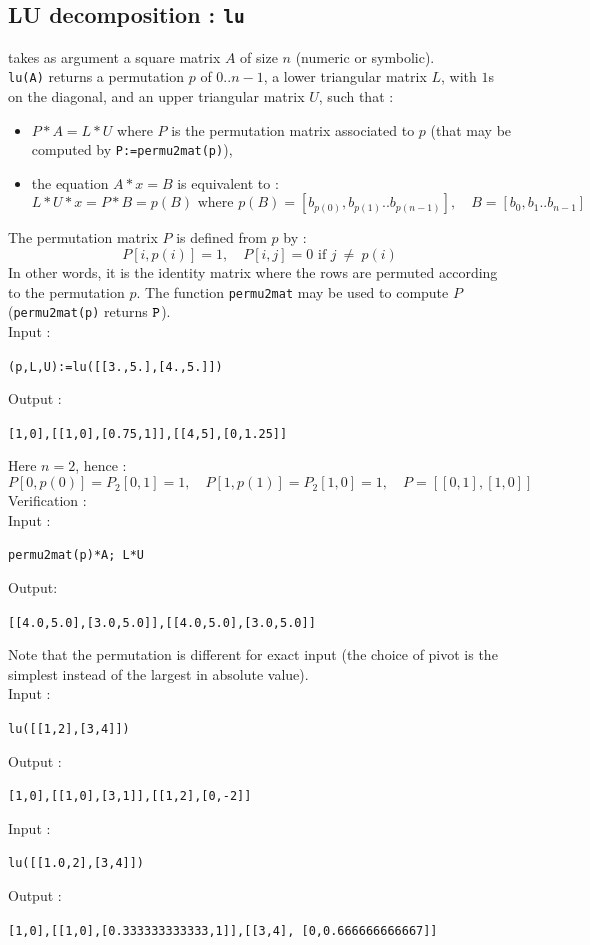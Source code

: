 \documentclass[a4paper,11pt]{book}
\begin{document}
\subsection{LU decomposition : {\tt lu}}
 takes as argument a square matrix $A$ of size $n$ (numeric or
symbolic).\\
{\tt lu(A)} returns a permutation $p$ of 0..$n-1$, 
a lower triangular matrix $L$, with $1$s on the diagonal, 
and an upper triangular matrix $U$, such that : 
\begin{itemize}
\item $P*A=L*U$ where $P$ is the permutation matrix 
associated to $p$ (that may be computed by {\tt P:=permu2mat(p)}),
\item the equation $A*x=B$ is equivalent to :
\[ L*U*x=P*B=p(B) \mbox{ where } p(B)=[b_{p(0)},b_{p(1)}..b_{p(n-1)}],
\quad  B=[b_0,b_1..b_{n-1}] \]
\end{itemize}
The permutation matrix $P$ is defined from $p$ by :
\[ P[i, p(i)]=1, \quad P[i, j]=0 \mbox{ if } j \ \neq\ p(i) \]
In other words, it is the identity matrix where the rows are permuted 
according to the permutation $p$. 
The function {\tt permu2mat} may be used to compute $P$
({\tt permu2mat(p)} returns ${\tt P}$).\\ 
Input :
\begin{center}{\tt (p,L,U):=lu([[3.,5.],[4.,5.]])}\end{center}
Output :
\begin{center}{\tt [1,0],[[1,0],[0.75,1]],[[4,5],[0,1.25]]}\end{center}
Here $n=2$, hence :
\[ P[0,p(0)]=P_2[0,1]=1, \quad  P[1,p(1)]=P_2[1,0]=1, \quad
P=[[0,1],[1,0]] \]
Verification :\\
Input :
\begin{center}{\tt permu2mat(p)*A; L*U}\end{center}
Output:
\begin{center}{\tt [[4.0,5.0],[3.0,5.0]],[[4.0,5.0],[3.0,5.0]]}\end{center}
Note that the permutation is different for exact input (the choice of
pivot is the simplest instead of the largest in absolute value).\\
Input :
\begin{center}{\tt lu([[1,2],[3,4]])}\end{center}
Output :
\begin{center}{\tt [1,0],[[1,0],[3,1]],[[1,2],[0,-2]]}\end{center}
Input :
\begin{center}{\tt lu([[1.0,2],[3,4]])}\end{center}
Output :
\begin{center}{\tt [1,0],[[1,0],[0.333333333333,1]],[[3,4], [0,0.666666666667]]}\end{center}
\end{document}

